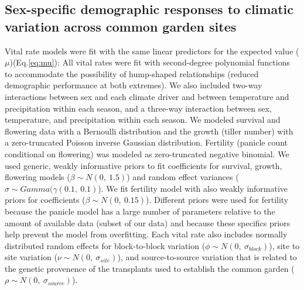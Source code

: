 \documentclass[12pt]{article}\usepackage[]{graphicx}\usepackage[dvipsnames]{xcolor}
\begin{document}
\subsection{Sex-specific demographic responses to climatic variation across common garden sites} \label {sssec:vital_rate}
Vital rate models were fit with the same linear predictors for the expected value ($\mu$)(Eq.\ref{eq:mu}):
All  vital rates  were  fit with second-degree polynomial functions to accommodate the possibility of hump-shaped relationships (reduced demographic performance at both extremes).
We also included two-way interactions between sex and each climate driver and between temperature and precipitation within each season, and a three-way interaction between sex, temperature, and precipitation within each season. 
We modeled survival and flowering data with a Bernoulli distribution and the growth (tiller number) with a zero-truncated Poisson inverse Gaussian distribution. 
Fertility (panicle count conditional on flowering) was modeled as zero-truncated negative binomial. 
We used generic, weakly informative priors to fit coefficients for survival, growth, flowering models ($\beta \sim N(0,\ 1.5)$) and random effect variances ($\sigma \sim Gamma(\gamma (0.1,\ 0.1)$).
We fit fertility model with  also weakly informative priors for coefficients ($\beta \sim N(0,\ 0.15)$).
Different priors  were used for fertility because the panicle model has a large number of parameters relative to the amount of available data (subset of our data) and because these specifics priors help  prevent the model from overfitting. 
Each vital rate also includes normally distributed random effects for block-to-block variation ($\phi \sim N(0,\ \sigma_{block})$), site to site variation ($\nu \sim N(0,\ \sigma_{site})$), and source-to-source variation that is related to the genetic provenence of the transplants used to establish the common garden ($\rho \sim N(0,\ \sigma_{source})$).
\end{document}

